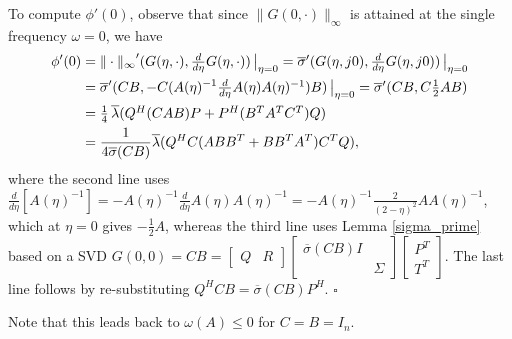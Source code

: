 \documentclass[12pt, a4paper,reqno]{amsart}
\renewenvironment{proof}{\noindent {\bf Proof: }}{\rm\\}
\theoremstyle{definition}
\begin{document}
\begin{proof}
To compute $\phi'(0)$, observe that
since $\|G(0,\cdot)\|_\infty$ is attained at the single frequency $\omega=0$, we have
\begin{align*}
\phi'(0)&= {\|\cdot\|_\infty}'(G(\eta,\cdot),\textstyle\frac{d}{d\eta} G(\eta,\cdot))\left\vert\begin{array}{c} \! \\ \vspace{-.4cm} \! \end{array}\right._{\!\!\!\!\!\!\!\eta=0} 
=\overline{\sigma}'(G(\eta,j0),\textstyle\frac{d}{d\eta}G(\eta,j0)) \left\vert\begin{array}{c} \! \\ \vspace{-.4cm} \! \end{array}\right._{\!\!\!\!\!\!\!\eta=0} 
\\
&= \overline{\sigma}'(CB,-C(A(\eta)^{-1} \textstyle\frac{d}{d\eta} A(\eta)A(\eta)^{-1})B) \left\vert\begin{array}{c} \! \\ \vspace{-.4cm} \! \end{array}\right._{\!\!\!\!\!\!\!\eta=0}
= \overline{\sigma}'(CB,C \textstyle\frac{1}{2}AB) \\ &= \textstyle\frac{1}{4}\, \overline{\lambda}(Q^H (CAB)P + P^H(B^TA^TC^T)Q) \\
&=\frac{1}{4 \overline{\sigma}(CB)} \overline{\lambda}(Q^H C(ABB^T + BB^TA^T)C^T Q), 
\end{align*}
where the second line uses $\frac{d}{d\eta} \left[ A(\eta)^{-1}\right]= - A(\eta)^{-1} \frac{d}{d\eta} A(\eta) A(\eta)^{-1} =
-A(\eta)^{-1} \frac{2}{(2-\eta)^2} A A(\eta)^{-1}$, which at $\eta=0$ gives $-\frac{1}{2}A$, whereas the third line uses 
Lemma \ref{sigma_prime} based on a SVD $G(0,0) =CB= \begin{bmatrix} Q&R\end{bmatrix} \begin{bmatrix} \overline{\sigma}(CB)I&\\&\Sigma\end{bmatrix}
\begin{bmatrix} P^T\\T^T\end{bmatrix}$.
The last line follows by re-substituting $Q^HCB = {\overline{\sigma}(CB)} P^H$.
\hfill $\square$
\end{proof}

Note that this leads back to $\omega(A)\leq 0$
for $C=B=I_n$.
\end{document}
